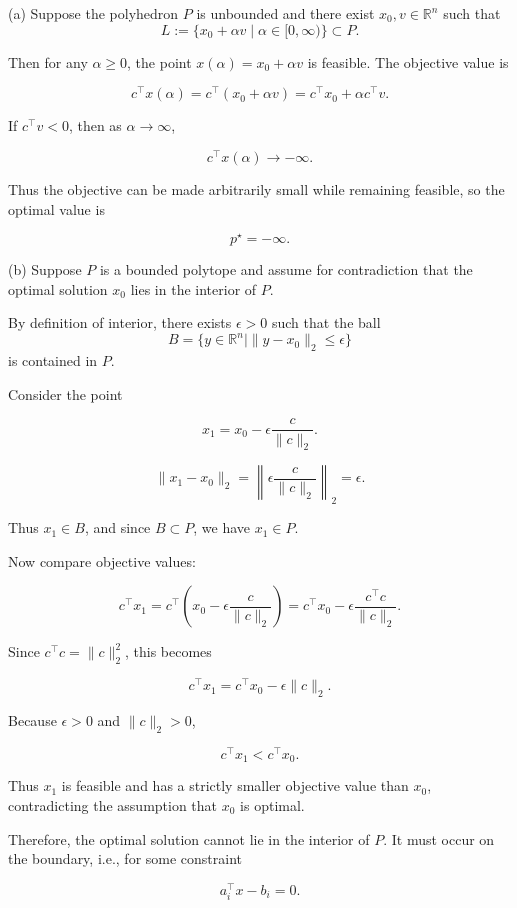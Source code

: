 \documentclass[
	12pt,
]{fphw}
\begin{document}
(a) Suppose the polyhedron $P$ is unbounded and there exist $x_0, v \in \mathbb{R}^n$ such that
\[
L := \{x_0 + \alpha v \mid \alpha \in [0,\infty)\} \subset P.
\]

Then for any $\alpha \ge 0$, the point $x(\alpha) = x_0 + \alpha v$ is feasible. The objective value is

\[
c^\top x(\alpha) = c^\top (x_0 + \alpha v)
= c^\top x_0 + \alpha c^\top v.
\]

If $c^\top v < 0$, then as $\alpha \to \infty$,

\[
c^\top x(\alpha) \to -\infty.
\]

Thus the objective can be made arbitrarily small while remaining feasible, so the optimal value is

\[
p^\star = -\infty.
\]

\bigskip

(b) Suppose $P$ is a bounded polytope and assume for contradiction that the optimal solution $x_0$ lies in the interior of $P$.

By definition of interior, there exists $\epsilon > 0$ such that the ball
\[
B = \{y \in \mathbb{R}^n \mid \|y - x_0\|_2 \le \epsilon\}
\]
is contained in $P$.

Consider the point

\[
x_1 = x_0 - \epsilon \frac{c}{\|c\|_2}.
\]

\[
\|x_1 - x_0\|_2
=
\left\|\epsilon \frac{c}{\|c\|_2}\right\|_2
=
\epsilon.
\]

Thus $x_1 \in B$, and since $B \subset P$, we have $x_1 \in P$.

Now compare objective values:

\[
c^\top x_1
=
c^\top \left(x_0 - \epsilon \frac{c}{\|c\|_2}\right)
=
c^\top x_0 - \epsilon \frac{c^\top c}{\|c\|_2}.
\]

Since $c^\top c = \|c\|_2^2$, this becomes

\[
c^\top x_1
=
c^\top x_0 - \epsilon \|c\|_2.
\]

Because $\epsilon > 0$ and $\|c\|_2 > 0$,

\[
c^\top x_1 < c^\top x_0.
\]

Thus $x_1$ is feasible and has a strictly smaller objective value than $x_0$, contradicting the assumption that $x_0$ is optimal.

Therefore, the optimal solution cannot lie in the interior of $P$. It must occur on the boundary, i.e., for some constraint

\[
a_i^\top x - b_i = 0.
\]
\end{document}
